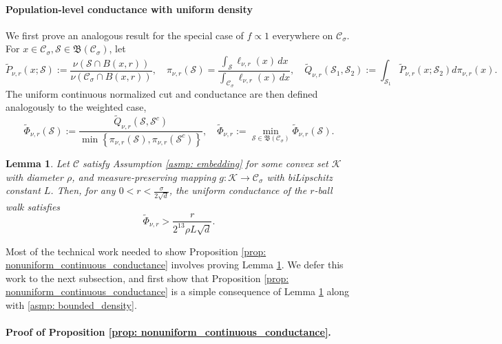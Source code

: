 \documentclass[11pt,twoside]{article}
\newtheorem{lemma}{Lemma}
\newcommand{\set}[1]{\left\{#1\right\}}
\newcommand{\1}{\mathbf{1}}
\newcommand{\Sset}{\mathcal{S}}
\newcommand{\Cset}{\mathcal{C}}
\newcommand{\Csig}{\Cset_{\sigma}}
\newcommand{\dx}{\,dx}
\begin{document}
\paragraph{Population-level conductance with uniform density}
We first prove an analogous result for the special case of $f \propto 1$ everywhere on $\Csig$. For $x \in \Csig, \Sset \in \mathfrak{B}(\Csig)$, let 
\begin{equation*}
\widetilde{P}_{\nu,r}(x; \Sset) := \frac{\nu(\Sset \cap B(x,r))}{\nu(\Csig \cap B(x,r))}, \quad \pi_{\nu,r}(\Sset) = \frac{\int_{\Sset} \ell_{\nu,r}(x) \dx}{\int_{\Csig} \ell_{\nu,r}(x) \dx}, \quad  \widetilde{Q}_{\nu,r}(\Sset_1,\Sset_2) := \int_{\Sset_1} \widetilde{P}_{\nu,r}(x;\Sset_2) d\pi_{\nu,r}(x).
\end{equation*}
The uniform continuous normalized cut and conductance are then defined analogously to the weighted case,
\begin{equation*}
\widetilde{\Phi}_{\nu,r}(\Sset) := \frac{\widetilde{Q}_{\nu,r}(\Sset, \Sset^c)}{\min \set{\pi_{\nu,r}(\Sset),\pi_{\nu,r}(\Sset^c)}}, \quad \widetilde{\Phi}_{\nu,r} := \min_{\Sset \in \mathfrak{B}(\Csig)} \widetilde{\Phi}_{\nu,r}(\Sset).
\end{equation*}

\begin{lemma}
	\label{lem: uniform_continuous_conductance}
	Let $\Cset$ satisfy Assumption \ref{asmp: embedding} for some convex set $\mathcal{K}$ with diameter $\rho$, and measure-preserving mapping $g: \mathcal{K} \to \Csig$ with biLipschitz constant $L$. Then, for any $0 < r < \frac{\sigma}{2\sqrt{d}}$, the uniform conductance of the $r$-ball walk satisfies
	\begin{equation*}
	\widetilde{\Phi}_{\nu,r} > \frac{r}{2^{13} \rho L \sqrt{d}}.
	\end{equation*}
\end{lemma}

Most of the technical work needed to show Proposition \ref{prop: nonuniform_continuous_conductance} involves proving Lemma \ref{lem: uniform_continuous_conductance}. We defer this work to the next subsection, and first show that Proposition \ref{prop: nonuniform_continuous_conductance} is a simple consequence of Lemma \ref{lem: uniform_continuous_conductance} along with \ref{asmp: bounded_density}.

\paragraph{Proof of Proposition \ref{prop: nonuniform_continuous_conductance}.}
\end{document}
